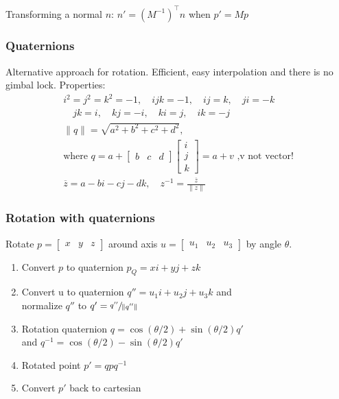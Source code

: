 \documentclass[a4paper,10pt]{article}
\begin{document}
Transforming a normal \( n \): \( n' = (M^{-1})^\top n \) when \( p' = Mp \)

\subsubsection{Quaternions} Alternative approach for rotation. Efficient, easy interpolation and there is no gimbal lock. Properties:
\begin{align*}
	i^2=j^2=k^2 = -1, \quad ijk = -1, \quad ij=k, \quad ji=-k \\ \quad jk=i, \quad kj = -i, \quad ki = j, \quad ik = -j \\
	\lVert q \rVert = \sqrt{a^2+b^2+c^2+d^2},\\ \text{where } q = a + \left[\begin{smallmatrix} b & c & d \end{smallmatrix}\right] \left[\begin{smallmatrix} i \\ j \\ k \end{smallmatrix}\right] = a + v \text{ ,v not vector!} \\
	\overline{z} = a - bi - cj - dk, \quad z^{-1} = \frac{\overline{z}}{\lVert z \rVert}
\end{align*}

\subsubsection{Rotation with quaternions} Rotate \( p = \left[\begin{smallmatrix} x & y & z \end{smallmatrix}\right] \) around axis \( u = \left[\begin{smallmatrix} u_{1} & u_{2} & u_{3} \end{smallmatrix}\right] \) by angle \( \theta  \).
\begin{enumerate}
    \item Convert \( p \) to quaternion \( p_Q = xi + yj + zk \)
    \item Convert u to quaternion \( q'' = u_{1}i+u_{2}j+u_{3}k \) and \\ normalize \( q'' \) to \( q' = \sfrac{q''}{\lVert q'' \rVert} \)
    \item Rotation quaternion \( q = \cos (\theta /2) + \sin (\theta /2) q' \) \\ and \( q^{-1} = \cos (\theta /2) - \sin (\theta /2) q' \)
    \item Rotated point \( p' = q p q^{-1} \)
    \item Convert \( p' \) back to cartesian
\end{enumerate}
\end{document}
